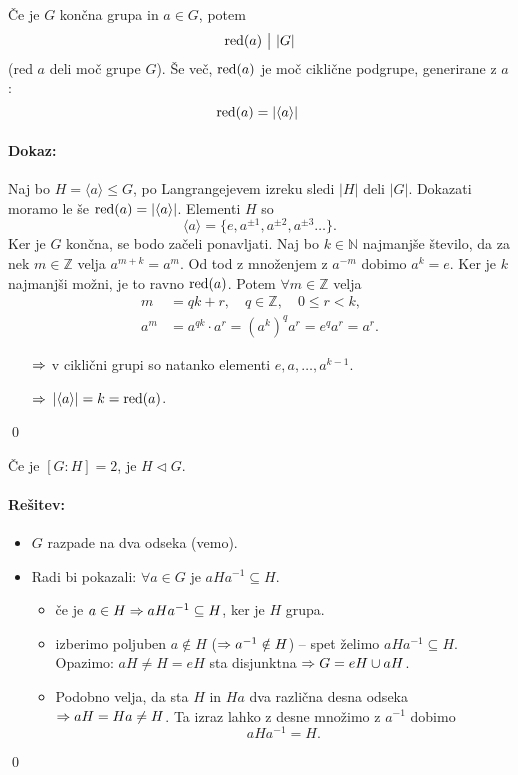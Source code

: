 \begin{posledica}
	\v Ce je $G$ kon\v cna grupa in $a \in G$, potem 
	\[
		\operatorname{red}(a)\ \big|\ |G|
	\] (red $a$ deli mo\v c grupe $G$). \v Se ve\v c, $\operatorname{red}(a)$ je mo\v c cikli\v cne podgrupe, generirane
	z $a$:
	\[
		\red(a) = |\langle a \rangle|\ 
	\]
\end{posledica}

\paragraph{Dokaz:}
Naj bo $H = \langle a \rangle \leq G$, po Langrangejevem izreku sledi $|H|$ deli $|G|$. Dokazati moramo le \v se $\operatorname{red} (a) = |\langle a \rangle |$. Elementi
$H$ so
\[
	\langle a \rangle = \{e, a^{\pm 1}, a^{\pm 2}, a^{\pm 3} \ldots\}.
\]
Ker je $G$ kon\v cna, se bodo za\v celi ponavljati. Naj bo $k\in \mathbb{N}$ najmanj\v se \v stevilo, da za nek $m \in \mathbb{Z}$
velja $a^{m+k} = a^m$. Od tod z mno\v zenjem z $a^{-m}$ dobimo $a^k = e$. Ker je $k$ najmanj\v si mo\v zni, je to ravno
$\operatorname{red}(a)$. Potem $\forall m \in \mathbb{Z}$ velja
\begin{align*}
	m &= qk + r,\quad q \in \mathbb{Z}, \quad 0 \leq r < k, \\
	a^m &= a^{qk} \cdot a^r = (a^k)^q a^r = e^q a^r = a^r.
\end{align*}
\begin{itemize}
	\item[$\Rightarrow$]{v cikli\v cni grupi so natanko elementi $e, a, \ldots, a^{k-1}$.}
	\item[$\Rightarrow$]{$|\langle a \rangle| = k = \operatorname{red} (a)$.}
\end{itemize}
\qed

\begin{zgled}
\v Ce je $[G:H] = 2$, je $H \lhd G$.
\paragraph{Re\v sitev:}
\begin{itemize}
	\item{$G$ razpade na dva odseka (vemo).}
	\item{Radi bi pokazali: $\forall a \in G$ je $aHa^{-1} \subseteq H$.
		\begin{itemize}
			\item{\v ce je $a \in H \Rightarrow a H a^{-1} \subseteq H$, ker je $H$ grupa.}
			\item{izberimo poljuben $a \notin H$ ($\Rightarrow a^{-1} \notin H$) -- spet \v zelimo $aHa^{-1} \subseteq H$. Opazimo:
				$aH \neq H = eH$ \then sta disjunktna $\Rightarrow G = eH \cup aH$.}
			\item{Podobno velja, da sta $H$ in $Ha$ dva razli\v cna desna odseka $\Rightarrow aH = Ha \neq H$. Ta izraz lahko
				z desne mno\v zimo z $a^{-1}$ dobimo
				\[
					aHa^{-1} = H.
				\]}
		\end{itemize}}
\end{itemize}
\qed
\end{zgled}

